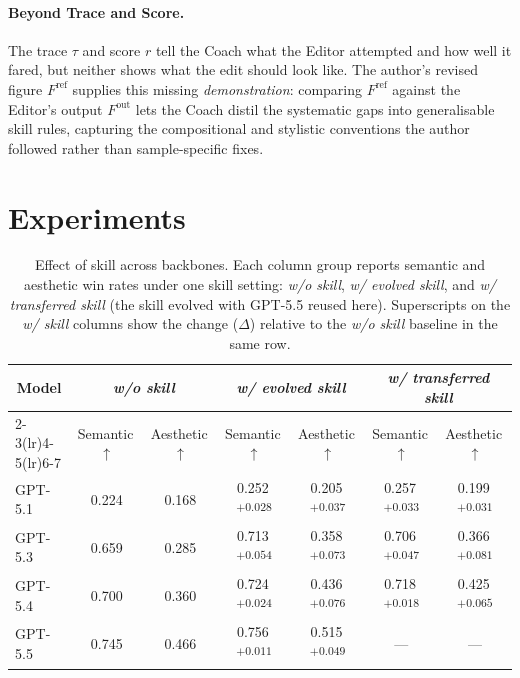 \documentclass[11pt]{article}
\begin{document}
\paragraph{Beyond Trace and Score.}
The trace $\tau$ and score $r$ tell the Coach what the Editor
attempted and how well it fared, but neither shows what the edit
should look like.  The author's revised figure $F^{\mathrm{ref}}$
supplies this missing \emph{demonstration}: comparing
$F^{\mathrm{ref}}$ against the Editor's output $F^{\mathrm{out}}$
lets the Coach distil the systematic gaps into generalisable skill
rules, capturing the compositional and stylistic conventions the
author followed rather than sample-specific fixes.

\section{Experiments}
\label{sec:experiments}

\begin{table}[!t]
\centering\small
\begin{tabular*}{\linewidth}{@{\extracolsep{\fill}}lcccccc@{}}
\toprule
\multicolumn{1}{c}{\multirow{2}{*}{\textbf{Model}}}
  & \multicolumn{2}{c}{\textit{w/o skill}}
  & \multicolumn{2}{c}{\textit{w/ evolved skill}}
  & \multicolumn{2}{c}{\textit{w/ transferred skill}} \\
\cmidrule(lr){2-3}\cmidrule(lr){4-5}\cmidrule(lr){6-7}
  & Semantic\,$\uparrow$ & Aesthetic\,$\uparrow$
  & Semantic\,$\uparrow$ & Aesthetic\,$\uparrow$
  & Semantic\,$\uparrow$ & Aesthetic\,$\uparrow$ \\
\midrule
\textsc{GPT-5.1} & 0.224        & 0.168        & 0.252\,\textsuperscript{\scriptsize $+0.028$} & 0.205\,\textsuperscript{\scriptsize $+0.037$} & 0.257\,\textsuperscript{\scriptsize $+0.033$} & 0.199\,\textsuperscript{\scriptsize $+0.031$} \\
\textsc{GPT-5.3} & 0.659        & 0.285        & 0.713\,\textsuperscript{\scriptsize $+0.054$} & 0.358\,\textsuperscript{\scriptsize $+0.073$} & 0.706\,\textsuperscript{\scriptsize $+0.047$} & 0.366\,\textsuperscript{\scriptsize $+0.081$} \\
\textsc{GPT-5.4} & 0.700        & 0.360        & 0.724\,\textsuperscript{\scriptsize $+0.024$} & 0.436\,\textsuperscript{\scriptsize $+0.076$} & 0.718\,\textsuperscript{\scriptsize $+0.018$} & 0.425\,\textsuperscript{\scriptsize $+0.065$} \\
\textsc{GPT-5.5} & 0.745        & 0.466        & 0.756\,\textsuperscript{\scriptsize $+0.011$} & 0.515\,\textsuperscript{\scriptsize $+0.049$} & ---          & ---          \\
\bottomrule
\end{tabular*}
\caption{Effect of skill across backbones.  Each column
group reports semantic and aesthetic win rates under one
skill setting: \emph{w/o skill}, \emph{w/ evolved skill},
and \emph{w/ transferred skill} (the skill evolved with
\textsc{GPT-5.5} reused here).  Superscripts on the
\emph{w/ skill} columns show the change ($\Delta$) relative
to the \emph{w/o skill} baseline in the same row.}
\label{tab:transfer}
\end{table}
\end{document}
